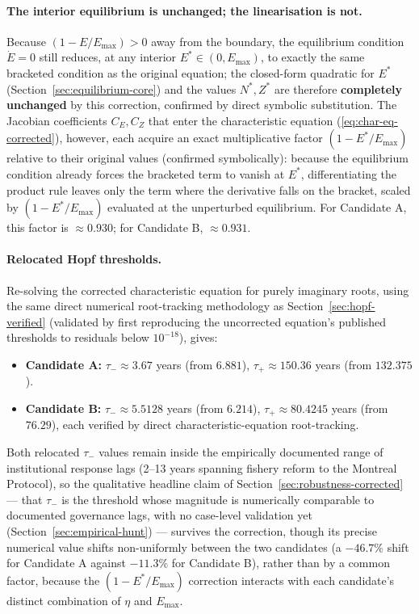\documentclass[twocolumn,10pt]{article}
\begin{document}
\paragraph{The interior equilibrium is unchanged; the linearisation is not.} Because $(1-E/E_{\max})>0$ away from the boundary, the equilibrium condition $\dot E=0$ still reduces, at any interior $E^*\in(0,E_{\max})$, to exactly the same bracketed condition as the original equation; the closed-form quadratic for $E^*$ (Section~\ref{sec:equilibrium-core}) and the values $N^*,Z^*$ are therefore \textbf{completely unchanged} by this correction, confirmed by direct symbolic substitution. The Jacobian coefficients $C_E,C_Z$ that enter the characteristic equation (\ref{eq:char-eq-corrected}), however, each acquire an exact multiplicative factor $(1-E^*/E_{\max})$ relative to their original values (confirmed symbolically): because the equilibrium condition already forces the bracketed term to vanish at $E^*$, differentiating the product rule leaves only the term where the derivative falls on the bracket, scaled by $(1-E^*/E_{\max})$ evaluated at the unperturbed equilibrium. For Candidate A, this factor is $\approx0.930$; for Candidate B, $\approx0.931$.

\paragraph{Relocated Hopf thresholds.} Re-solving the corrected characteristic equation for purely imaginary roots, using the same direct numerical root-tracking methodology as Section~\ref{sec:hopf-verified} (validated by first reproducing the uncorrected equation's published thresholds to residuals below $10^{-18}$), gives:
\begin{itemize}
\item \textbf{Candidate A:} $\tau_-\approx3.67$ years (from $6.881$), $\tau_+\approx150.36$ years (from $132.375$).
\item \textbf{Candidate B:} $\tau_-\approx5.5128$ years (from $6.214$), $\tau_+\approx80.4245$ years (from $76.29$), each verified by direct characteristic-equation root-tracking.
\end{itemize}
Both relocated $\tau_-$ values remain inside the empirically documented range of institutional response lags \cite{hocherman2025} (2--13 years spanning fishery reform to the Montreal Protocol), so the qualitative headline claim of Section~\ref{sec:robustness-corrected} --- that $\tau_-$ is the threshold whose magnitude is numerically comparable to documented governance lags, with no case-level validation yet (Section~\ref{sec:empirical-hunt}) --- survives the correction, though its precise numerical value shifts non-uniformly between the two candidates (a $-46.7\%$ shift for Candidate A against $-11.3\%$ for Candidate B), rather than by a common factor, because the $(1-E^*/E_{\max})$ correction interacts with each candidate's distinct combination of $\eta$ and $E_{\max}$.
\end{document}
